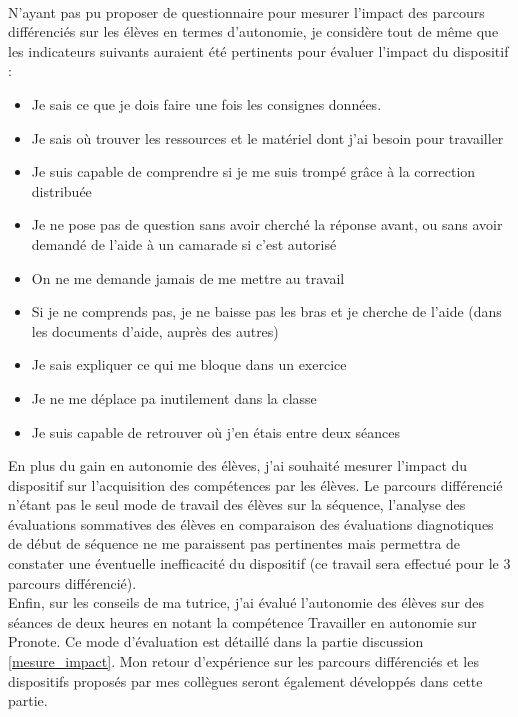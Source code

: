 \paragraph{} N'ayant pas pu proposer de questionnaire pour mesurer l'impact des parcours différenciés sur les élèves en termes d'autonomie, je considère tout de même que les indicateurs suivants auraient été pertinents pour évaluer l'impact du dispositif :
\begin{itemize}
	\item \og Je sais ce que je dois faire une fois les consignes données.\fg{}
	\item \og Je sais où trouver les ressources et le matériel dont j'ai besoin pour travailler \fg{}
	\item \og Je suis capable de comprendre si je me suis trompé grâce à la correction distribuée \fg{}
	\item \og Je ne pose pas de question sans avoir cherché la réponse avant, ou sans avoir demandé de l'aide à un camarade si c'est autorisé \fg{}
	\item \og On ne me demande jamais de me mettre au travail \fg{}
	\item \og Si je ne comprends pas, je ne baisse pas les bras et je cherche de l'aide (dans les documents d'aide, auprès des autres) \fg{}
	\item \og Je sais expliquer ce qui me bloque dans un exercice \fg{}
	\item \og Je ne me déplace pa inutilement dans la classe \fg{}
	\item \og Je suis capable de retrouver où j'en étais entre deux séances \fg{}
\end{itemize}
 En plus du gain en autonomie des élèves, j'ai souhaité mesurer l'impact du dispositif sur l'acquisition des compétences par les élèves. Le parcours différencié n'étant pas le seul mode de travail des élèves sur la séquence, l'analyse des évaluations sommatives des élèves en comparaison des évaluations diagnotiques de début de séquence ne me paraissent pas pertinentes mais permettra de constater une éventuelle inefficacité du dispositif (ce travail sera effectué pour le 3 parcours différencié).\\
 Enfin, sur les conseils de ma tutrice, j'ai évalué l'autonomie des élèves sur des séances de deux heures en \og notant \fg{} la compétence \og Travailler en autonomie \fg{} sur Pronote. Ce mode d'évaluation est détaillé dans la partie discussion \ref{mesure_impact}. Mon retour d'expérience sur les parcours différenciés et les dispositifs proposés par mes collègues seront également développés dans cette partie.
